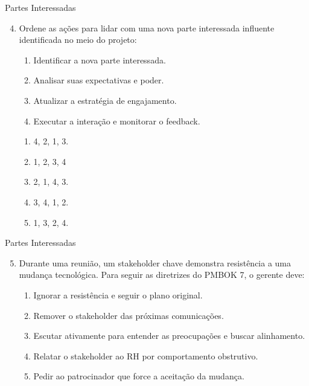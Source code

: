 \documentclass{beamer}
\begin{document}
\begin{frame}{Partes Interessadas}
	\begin{enumerate}
		\setcounter{enumi}{3}
		\justifying
		\item Ordene as ações para lidar com uma nova parte interessada influente identificada no meio do projeto:
		\begin{enumerate}[I]
			\item Identificar a nova parte interessada.
			\item Analisar suas expectativas e poder.
			\item Atualizar a estratégia de engajamento.
			\item Executar a interação e monitorar o feedback.
		\end{enumerate}
		\begin{enumerate}[a]
			\item 4, 2, 1, 3.
			\item \alert<2>{1, 2, 3, 4}
			\item 2, 1, 4, 3.
			\item 3, 4, 1, 2.
			\item 1, 3, 2, 4.
		\end{enumerate}
	\end{enumerate}
\end{frame}

\begin{frame}{Partes Interessadas}
	\begin{enumerate}
		\setcounter{enumi}{4}
		\justifying
		\item Durante uma reunião, um stakeholder chave demonstra resistência a uma mudança tecnológica. Para seguir as diretrizes do PMBOK 7, o gerente deve:
		\begin{enumerate}[a]
			\item Ignorar a resistência e seguir o plano original.
			\item Remover o stakeholder das próximas comunicações.
			\item \alert<2>{Escutar ativamente para entender as preocupações e buscar alinhamento.}
			\item Relatar o stakeholder ao RH por comportamento obstrutivo.
			\item Pedir ao patrocinador que force a aceitação da mudança.
		\end{enumerate}
	\end{enumerate}
\end{frame}
\end{document}
